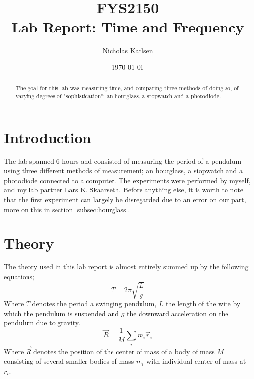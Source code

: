 \documentclass[%
 reprint,
 amsmath,amssymb,
 aps,
]{revtex4-1}
\begin{document}

\title{FYS2150 \\
Lab Report: Time and Frequency}%

\author{Nicholas Karlsen}

\date{\today}%

\begin{abstract}
The goal for this lab was measuring time, and comparing three methods of doing so, of varying degrees of "sophistication"; an hourglass, a stopwatch and a photodiode.
\end{abstract}

\maketitle


\section{\label{sec:intro}Introduction}
	The lab spanned 6 hours and consisted of measuring the period of a pendulum using three different methods of measurement; an hourglass, a stopwatch and a photodiode connected to a computer. The experiments were performed by myself, and my lab partner Lars K. Skaarseth.
	Before anything else, it is worth to note that the first experiment can largely be disregarded due to an error on our part, more on this in section \ref{subsec:hourglass}.

\section{Theory}
	The theory used in this lab report is almost entirely summed up by the following equations;
	\begin{equation}
		T = 2\pi \sqrt{\frac{L}{g}}
	\end{equation}
	Where $T$ denotes the period a swinging pendulum, $L$ the length of the wire by which the pendulum is suspended and $g$ the downward acceleration on the pendulum due to gravity.
	\begin{equation}
		\vec R = \frac{1}{M} \sum_i m_i \vec r_i
	\end{equation}
	Where $\vec R$ denotes the position of the center of mass of a body of mass $M$ consisting of several smaller bodies of mass $m_i$ with individual center of mass at $r_i$.
\end{document}
